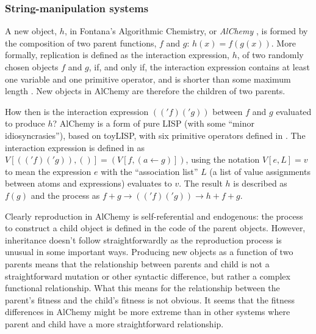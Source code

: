 \subsubsection{String-manipulation systems}

A new object, $h$, in Fontana's Algorithmic Chemistry, or \emph{AlChemy} \parencite{Fontana1992}, is formed by the composition of two parent functions, $f$ and $g$: $h(x)=f(g(x))$. More formally, replication is defined as the interaction expression, $h$, of two randomly chosen objects $f$ and $g$, if, and only if, the interaction expression contains at least one variable and one primitive operator, and is shorter than some maximum length \parencite[p.173--p.180]{Fontana1992}. New objects in AlChemy are therefore the children of two parents.

How then is the interaction expression $(('f)('g))$ between $f$ and $g$ evaluated to produce $h$? AlChemy is a form of pure LISP (with some ``minor idiosyncrasies''), based on toyLISP, with six primitive operators defined in \textcite[p.205]{Fontana1992}. The interaction expression is defined in \textcite[definition A.9, p.204]{Fontana1992} as $V[(('f)('g)),()] = (V[f,(a\leftarrow g)])$, using the notation $V[e,L]=v$ to mean the expression $e$ with the ``association list'' $L$ (a list of value assignments between atoms and expressions) evaluates to $v$. The result $h$ is described as $f(g)$ and the process as $f+g \rightarrow (('f)('g)) \rightarrow h + f + g$.

Clearly reproduction in AlChemy is self-referential and endogenous: the process to construct a child object is defined in the code of the parent objects. However, inheritance doesn't follow straightforwardly as the reproduction process is unusual in some important ways. Producing new objects as a function of two parents means that the relationship between parents and child is not a straightforward mutation or other syntactic difference, but rather a complex functional relationship. What this means for the relationship between the parent's fitness and the child's fitness is not obvious. It seems that the fitness differences in AlChemy might be more extreme than in other systems where parent and child have a more straightforward relationship.

